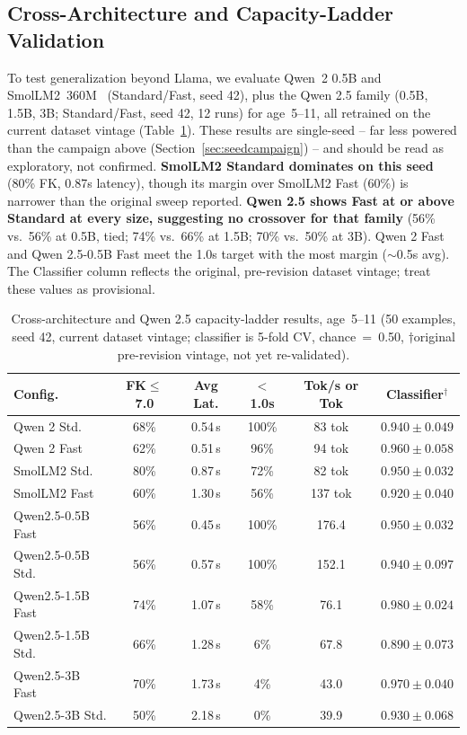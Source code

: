 \documentclass[pdflatex,sn-mathphys-num]{sn-jnl}%
\begin{document}
\subsection{Cross-Architecture and Capacity-Ladder Validation}\label{sec:crossarch}

To test generalization beyond Llama, we evaluate Qwen~2 0.5B and SmolLM2~360M~\cite{allal2025smollm2} (Standard/Fast, seed 42), plus the Qwen 2.5 family (0.5B, 1.5B, 3B; Standard/Fast, seed 42, 12 runs) for age~5--11, all retrained on the current dataset vintage (Table~\ref{tab:crossarch}). These results are single-seed -- far less powered than the campaign above (Section~\ref{sec:seedcampaign}) -- and should be read as exploratory, not confirmed. \textbf{SmolLM2 Standard dominates on this seed} (80\% FK, 0.87s latency), though its margin over SmolLM2 Fast (60\%) is narrower than the original sweep reported. \textbf{Qwen 2.5 shows Fast at or above Standard at every size, suggesting no crossover for that family} (56\% vs.\ 56\% at 0.5B, tied; 74\% vs.\ 66\% at 1.5B; 70\% vs.\ 50\% at 3B). Qwen 2 Fast and Qwen 2.5-0.5B Fast meet the 1.0s target with the most margin ($\sim$0.5s avg). The Classifier column reflects the original, pre-revision dataset vintage; treat these values as provisional.

\begin{table}[!h]
  \centering
  \caption{Cross-architecture and Qwen 2.5 capacity-ladder results, age~5--11 (50 examples, seed 42, current dataset vintage; classifier is 5-fold CV, chance~=~0.50, $\dagger$original pre-revision vintage, not yet re-validated).}
  \label{tab:crossarch}
  \scriptsize
  \setlength{\tabcolsep}{3pt}
  \begin{tabular}{@{}lccccc@{}}
    \toprule
    Config. & FK$\leq$7.0 & Avg Lat. & $<$1.0s & Tok/s or Tok & Classifier$^\dagger$ \\
    \midrule
    Qwen 2 Std.       & 68\% & 0.54\,s & 100\% & 83 tok  & $0.940 \pm 0.049$ \\
    Qwen 2 Fast       & 62\% & 0.51\,s & 96\%  & 94 tok  & $0.960 \pm 0.058$ \\
    SmolLM2 Std.      & 80\% & 0.87\,s & 72\%  & 82 tok  & $0.950 \pm 0.032$ \\
    SmolLM2 Fast      & 60\% & 1.30\,s & 56\%  & 137 tok & $0.920 \pm 0.040$ \\
    Qwen2.5-0.5B Fast & 56\% & 0.45\,s & 100\% & 176.4   & $0.950 \pm 0.032$ \\
    Qwen2.5-0.5B Std. & 56\% & 0.57\,s & 100\% & 152.1   & $0.940 \pm 0.097$ \\
    Qwen2.5-1.5B Fast & 74\% & 1.07\,s & 58\%  & 76.1    & $\mathbf{0.980 \pm 0.024}$ \\
    Qwen2.5-1.5B Std. & 66\% & 1.28\,s & 6\%   & 67.8    & $0.890 \pm 0.073$ \\
    Qwen2.5-3B Fast   & 70\% & 1.73\,s & 4\%   & 43.0    & $0.970 \pm 0.040$ \\
    Qwen2.5-3B Std.   & 50\% & 2.18\,s & 0\%   & 39.9    & $0.930 \pm 0.068$ \\
    \bottomrule
  \end{tabular}
\end{table}
\end{document}
